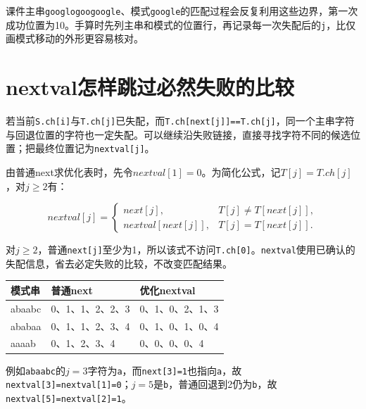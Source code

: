 课件主串\texttt{googlogoogoogle}、模式\texttt{google}的匹配过程会反复利用这些边界，第一次成功位置为10。手算时先列主串和模式的位置行，再记录每一次失配后的\texttt{j}，比仅画模式移动的外形更容易核对。

\section{nextval怎样跳过必然失败的比较}\label{DS04-nextval}

若当前\texttt{S.\allowbreak{}ch[\allowbreak{}i]\allowbreak{}}与\texttt{T.\allowbreak{}ch[\allowbreak{}j]\allowbreak{}}已失配，而\texttt{T.\allowbreak{}ch[\allowbreak{}next[\allowbreak{}j]\allowbreak{}]\allowbreak{}=\allowbreak{}=\allowbreak{}T.\allowbreak{}ch[\allowbreak{}j]\allowbreak{}}，同一个主串字符与回退位置的字符也一定失配。可以继续沿失败链接，直接寻找字符不同的候选位置；把最终位置记为\texttt{nextval[\allowbreak{}j]\allowbreak{}}。

由普通next求优化表时，先令\(nextval[1]=0\)。为简化公式，记\(T[j]=T.ch[j]\)，对\(j\ge2\)有：

\[nextval[j]=\begin{cases}
next[j],&T[j]\ne T[next[j]],\\
nextval[next[j]],&T[j]=T[next[j]].
\end{cases}\]

对\(j\ge2\)，普通\texttt{next[\allowbreak{}j]\allowbreak{}}至少为1，所以该式不访问\texttt{T.\allowbreak{}ch[\allowbreak{}0]\allowbreak{}}。\texttt{nextval}使用已确认的失配信息，省去必定失败的比较，不改变匹配结果。

\par\medskip\noindent\begin{minipage}{\linewidth}\fontsize{9.3}{12}\selectfont\begin{tabularx}{\linewidth}{@{}YYY@{}}
\toprule\noalign{}
模式串 & 普通next & 优化nextval \\
\midrule\noalign{}


abaabc & 0、1、1、2、2、3 & 0、1、0、2、1、3 \\
ababaa & 0、1、1、2、3、4 & 0、1、0、1、0、4 \\
aaaab & 0、1、2、3、4 & 0、0、0、0、4 \\
\bottomrule\end{tabularx}
\end{minipage}\par\medskip

例如\texttt{abaabc}的\(j=3\)字符为\texttt{a}，而\texttt{next[\allowbreak{}3]\allowbreak{}=\allowbreak{}1}也指向\texttt{a}，故\texttt{nextval[\allowbreak{}3]\allowbreak{}=\allowbreak{}nextval[\allowbreak{}1]\allowbreak{}=\allowbreak{}0}；\(j=5\)是\texttt{b}，普通回退到2仍为\texttt{b}，故\texttt{nextval[\allowbreak{}5]\allowbreak{}=\allowbreak{}nextval[\allowbreak{}2]\allowbreak{}=\allowbreak{}1}。

